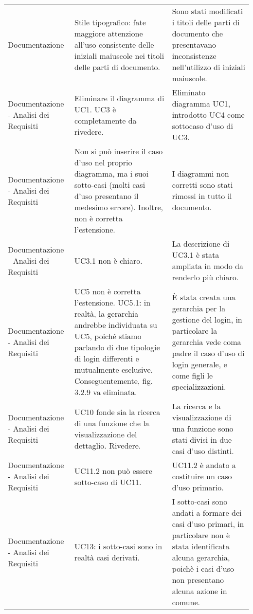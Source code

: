 \begin{longtable}{ 
				>{\centering}p{} 
				>{\centering}p{}
				>{\centering\arraybackslash}p{}}
				Documentazione
					&
				Stile tipografico: fate maggiore attenzione all'uso consistente delle iniziali maiuscole nei titoli delle parti di documento.
					&
				Sono stati modificati i titoli delle parti di documento che presentavano inconsistenze nell'utilizzo di iniziali maiuscole.
					\\
						
				Documentazione - Analisi dei Requisiti
					&
				Eliminare il diagramma di UC1. UC3 è completamente da rivedere.
					&
				Eliminato diagramma UC1, introdotto UC4 come sottocaso d'uso di UC3.   
					\\
			
				Documentazione - Analisi dei Requisiti
					&
				Non si può inserire il caso d'uso nel proprio diagramma, ma i suoi sotto-casi (molti casi d'uso presentano il medesimo errore). Inoltre, non è corretta l'estensione.
					&
				I diagrammi non corretti sono stati rimossi in tutto il documento. 
					\\
			
				Documentazione - Analisi dei Requisiti
					&
				UC3.1 non è chiaro.
					&
				La descrizione di UC3.1 è stata ampliata in modo da renderlo più chiaro. 
					\\
			
				Documentazione - Analisi dei Requisiti
					&
				UC5 non è corretta l'estensione. UC5.1: in realtà, la gerarchia andrebbe individuata su UC5, poiché stiamo parlando di due tipologie di login differenti e mutualmente esclusive. Conseguentemente, fig. 3.2.9 va eliminata.
					&
				È stata creata una gerarchia per la gestione del login, in particolare la gerarchia vede coma padre il caso d'uso di login generale, e come figli le specializzazioni. 
					\\
			
				Documentazione - Analisi dei Requisiti
					&
				UC10 fonde sia la ricerca di una funzione che la visualizzazione del dettaglio. Rivedere.
					&
				La ricerca e la visualizzazione di una funzione sono stati divisi in due casi d'uso distinti. 
					\\
			
				Documentazione - Analisi dei Requisiti
					&
				UC11.2 non può essere sotto-caso di UC11.
					&
				UC11.2 è andato a costituire un caso d'uso primario. 
					\\
			
				Documentazione - Analisi dei Requisiti
					&
				UC13: i sotto-casi sono in realtà casi derivati.
					&
				I sotto-casi sono andati a formare dei casi d'uso primari, in particolare non è stata identificata alcuna gerarchia, poichè i casi d'uso non presentano alcuna azione in comune. 
					\\
							

\end{longtable}
